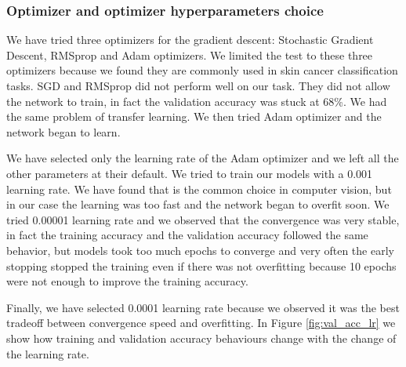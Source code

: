 		\subsubsection{Optimizer and optimizer hyperparameters choice}
			
			We have tried three optimizers for the gradient descent: Stochastic Gradient Descent, RMSprop and Adam optimizers. We limited the test to these three optimizers because we found they are commonly used in skin cancer classification tasks. SGD and RMSprop did not perform well on our task. They did not allow the network to train, in fact the validation accuracy was stuck at 68\%. We had the same problem of transfer learning. We then tried Adam optimizer and the network began to learn.
			
			\smallskip
			
			We have selected only the learning rate of the Adam optimizer and we left all the other parameters at their default. We tried to train our models with a 0.001 learning rate. We have found that is the common choice in computer vision, but in our case the learning was too fast and the network began to overfit soon. We tried 0.00001 learning rate and we observed that the convergence was very stable, in fact the training accuracy and the validation accuracy followed the same behavior, but models took too much epochs to converge and very often the early stopping stopped the training even if there was not overfitting because 10 epochs were not enough to improve the training accuracy.
			
			\smallskip
			
			Finally, we have selected 0.0001 learning rate because we observed it was the best tradeoff between convergence speed and overfitting.
			In Figure \ref{fig:val_acc_lr} we show how training and validation accuracy behaviours change with the change of the learning rate.
			
